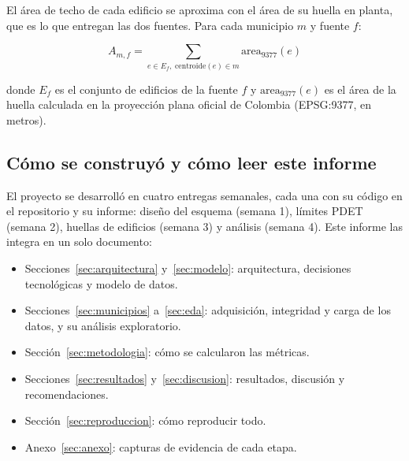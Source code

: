 El área de techo de cada edificio se aproxima con el área de su huella en
planta, que es lo que entregan las dos fuentes. Para cada municipio $m$ y
fuente $f$:

\begin{equation}
  A_{m,f} = \sum_{e \in E_f,\; \mathrm{centroide}(e) \in m} \mathrm{area}_{9377}(e)
  \label{eq:area}
\end{equation}

donde $E_f$ es el conjunto de edificios de la fuente $f$ y
$\mathrm{area}_{9377}(e)$ es el área de la huella calculada en la proyección
plana oficial de Colombia (EPSG:9377, en metros).

\subsection{Cómo se construyó y cómo leer este informe}

El proyecto se desarrolló en cuatro entregas semanales, cada una con su
código en el repositorio y su informe: diseño del esquema (semana 1), límites
PDET (semana 2), huellas de edificios (semana 3) y análisis (semana 4). Este
informe las integra en un solo documento:

\begin{itemize}
  \item Secciones~\ref{sec:arquitectura} y~\ref{sec:modelo}: arquitectura,
        decisiones tecnológicas y modelo de datos.
  \item Secciones~\ref{sec:municipios} a~\ref{sec:eda}: adquisición,
        integridad y carga de los datos, y su análisis exploratorio.
  \item Sección~\ref{sec:metodologia}: cómo se calcularon las métricas.
  \item Secciones~\ref{sec:resultados} y~\ref{sec:discusion}: resultados,
        discusión y recomendaciones.
  \item Sección~\ref{sec:reproduccion}: cómo reproducir todo.
  \item Anexo~\ref{sec:anexo}: capturas de evidencia de cada etapa.
\end{itemize}
